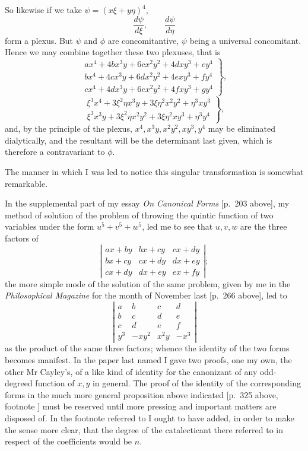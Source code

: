 \documentclass[11pt]{article}
\newcommand{\sourcepage}[1]{\marginpar{\scriptsize p.~#1}}
\begin{document}
{{\sourcepage{345}
So likewise if we take $\psi=(x\xi+y\eta)^4$,
\[
\frac{d\psi}{d\xi},\qquad \frac{d\psi}{d\eta}
\]
form a plexus. But $\psi$ and $\phi$ are concomitantive, $\psi$ being a universal concomitant. Hence we may combine together these two plexuses, that is
\[
\left.
\begin{array}{rrrrr}
ax^4+4bx^3y+6cx^2y^2+4dxy^3+ey^4\\
bx^4+4cx^3y+6dx^2y^2+4exy^3+fy^4\\
cx^4+4dx^3y+6ex^2y^2+4fxy^3+gy^4
\end{array}
\right\},
\]
\[
\left.
\begin{array}{rrrrr}
\xi^3x^4+3\xi^2\eta x^3y+3\xi\eta^2x^2y^2+\eta^3xy^3\\
\xi^3x^3y+3\xi^2\eta x^2y^2+3\xi\eta^2xy^3+\eta^3y^4
\end{array}
\right\},
\]
and, by the principle of the plexus, $x^4,x^3y,x^2y^2,xy^3,y^4$ may be eliminated dialytically, and the resultant will be the determinant last given, which is therefore a contravariant to $\phi$.

The manner in which I was led to notice this singular transformation is somewhat remarkable.

In the supplemental part of my essay \emph{On Canonical Forms} [p.~203 above], my method of solution of the problem of throwing the quintic function of two variables under the form $u^5+v^5+w^5$, led me to see that $u,v,w$ are the three factors of
\[
\left|\begin{array}{ccc}
ax+by&bx+cy&cx+dy\\
bx+cy&cx+dy&dx+ey\\
cx+dy&dx+ey&ex+fy
\end{array}\right|;
\]
the more simple mode of the solution of the same problem, given by me in the \emph{Philosophical Magazine} for the month of November last [p.~266 above], led to
\[
\left|\begin{array}{cccc}
a&b&c&d\\
b&c&d&e\\
c&d&e&f\\
y^3&-xy^2&x^2y&-x^3
\end{array}\right|
\]
as the product of the same three factors; whence the identity of the two forms becomes manifest. In the paper last named I gave two proofs, one my own, the other Mr Cayley's, of a like kind of identity for the canonizant of any odd-degreed function of $x,y$ in general. The proof of the identity of the corresponding forms in the much more general proposition above indicated [p.~325 above, footnote {\dag}] must be reserved until more pressing and important matters are disposed of. In the footnote referred to I ought to have added, in order to make the sense more clear, that the degree of the catalecticant there referred to in respect of the coefficients would be $n$.

}}
\end{document}
